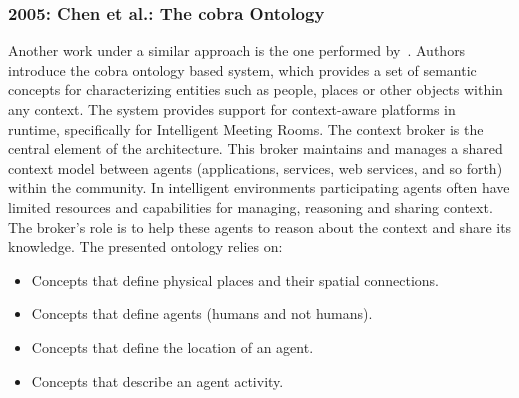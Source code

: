 \subsubsection{2005: Chen et al.: The \ac{cobra} Ontology}
\label{sec:gu}

Another work under a similar approach is the one performed by~\citet{chen_using_2005}.
Authors introduce the \ac{cobra} ontology based system, which provides a set of 
semantic concepts for characterizing entities such as people, places or other 
objects within any context. The system provides support for context-aware 
platforms in runtime, specifically for Intelligent Meeting Rooms. The context 
broker is the central element of the architecture. This broker maintains and 
manages a shared context model between agents (applications, services, web 
services, and so forth) within the community. In intelligent environments participating
agents often have limited resources and capabilities for managing, reasoning and
sharing context. The broker's role is to help these agents to reason about the
context and share its knowledge. The presented ontology relies on:

\begin{itemize}
  \item Concepts that define physical places and their spatial connections.
  \item Concepts that define agents (humans and not humans).
  \item Concepts that define the location of an agent.
  \item Concepts that describe an agent activity.
\end{itemize}